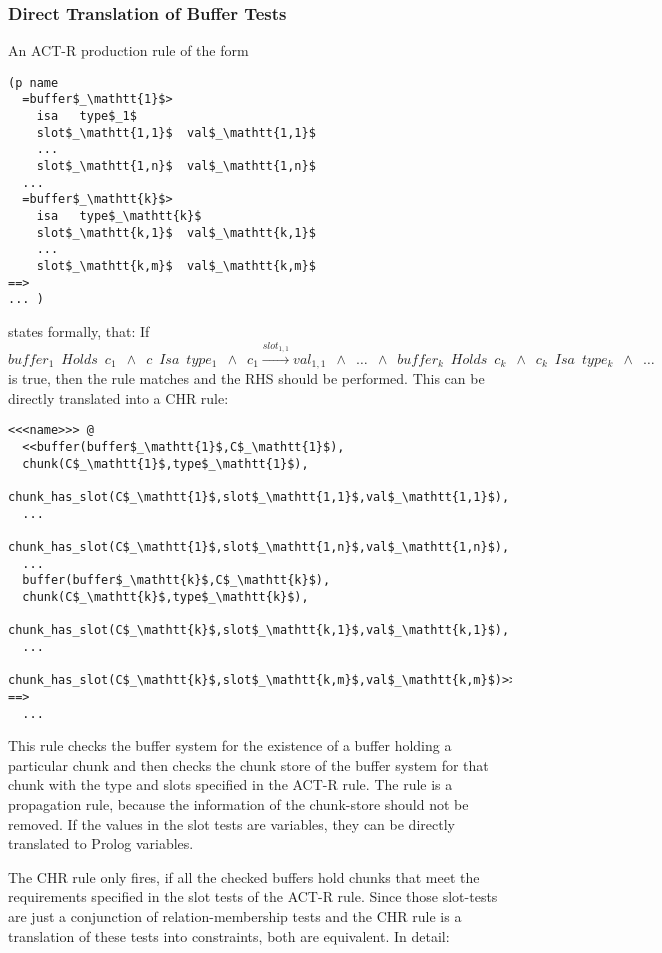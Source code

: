 \subsubsection{Direct Translation of Buffer Tests}

An ACT-R production rule of the form

\begin{lstlisting}[mathescape]
(p name
  =buffer$_\mathtt{1}$>
    isa   type$_1$
    slot$_\mathtt{1,1}$  val$_\mathtt{1,1}$
    ...
    slot$_\mathtt{1,n}$  val$_\mathtt{1,n}$
  ...
  =buffer$_\mathtt{k}$>
    isa   type$_\mathtt{k}$
    slot$_\mathtt{k,1}$  val$_\mathtt{k,1}$
    ...
    slot$_\mathtt{k,m}$  val$_\mathtt{k,m}$
==>
... )
\end{lstlisting}

states formally, that: If $buffer_1 \enspace Holds \enspace c_1 \enspace \wedge \enspace c \enspace Isa \enspace type_1 \enspace \wedge \enspace c_1 \xrightarrow{slot_{1,1}} val_{1,1} \enspace \wedge \enspace \dots \enspace \wedge \enspace buffer_k \enspace Holds \enspace c_k \enspace \wedge \enspace c_k \enspace Isa \enspace type_k \enspace \wedge \enspace \dots$ is true, then the rule matches and the RHS should be performed. This can be directly translated into a CHR rule:

\begin{lstlisting}[mathescape]
<<<name>>> @
  <<buffer(buffer$_\mathtt{1}$,C$_\mathtt{1}$),
  chunk(C$_\mathtt{1}$,type$_\mathtt{1}$),
  chunk_has_slot(C$_\mathtt{1}$,slot$_\mathtt{1,1}$,val$_\mathtt{1,1}$),
  ...
  chunk_has_slot(C$_\mathtt{1}$,slot$_\mathtt{1,n}$,val$_\mathtt{1,n}$),
  ...
  buffer(buffer$_\mathtt{k}$,C$_\mathtt{k}$),
  chunk(C$_\mathtt{k}$,type$_\mathtt{k}$),
  chunk_has_slot(C$_\mathtt{k}$,slot$_\mathtt{k,1}$,val$_\mathtt{k,1}$),
  ...
  chunk_has_slot(C$_\mathtt{k}$,slot$_\mathtt{k,m}$,val$_\mathtt{k,m}$)>>
==>
  ...
\end{lstlisting}

This rule checks the buffer system for the existence of a buffer holding a particular chunk and then checks the chunk store of the buffer system for that chunk with the type and slots specified in the ACT-R rule. The rule is a propagation rule, because the information of the chunk-store should not be removed. If the values in the slot tests are variables, they can be directly translated to Prolog variables.

The CHR rule only fires, if all the checked buffers hold chunks that meet the requirements specified in the slot tests of the ACT-R rule. Since those slot-tests are just a conjunction of relation-membership tests and the CHR rule is a translation of these tests into constraints, both are equivalent. In detail: 

